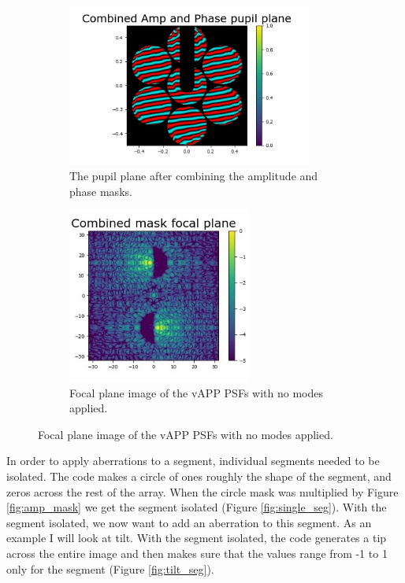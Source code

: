 \begin{figure}[H]
\centering
\begin{subfigure}{.5\textwidth}
  \centering
  \includegraphics[width=8cm]{Figures/GMT_amp_phase_comb.jpg}
  \caption{The pupil plane after combining the amplitude and phase masks.}
  \label{fig:pupil_comb}
\end{subfigure}%
\begin{subfigure}{.5\textwidth}
  \centering
  \includegraphics[width=6cm]{Figures/GMT_focal_plane.jpg}
  \caption{Focal plane image of the vAPP PSFs with no modes applied.}
  \label{fig:focal_comb}
\end{subfigure}
\label{fig:zero_GMT}
\end{figure}


In order to apply aberrations to a segment, individual segments needed to be isolated.  The code makes a circle of
ones roughly the shape of the segment, and zeros across the rest of the array. When the circle mask was multiplied
by Figure \ref{fig:amp_mask} we get the segment isolated (Figure \ref{fig:single_seg}).  With the segment isolated,
we now want to add an aberration to this segment.  As an example I will look at tilt.  With the segment isolated,
the code generates a tip across the entire image and then makes sure that the values range from -1 to 1 only for the
segment (Figure \ref{fig:tilt_seg}).  

